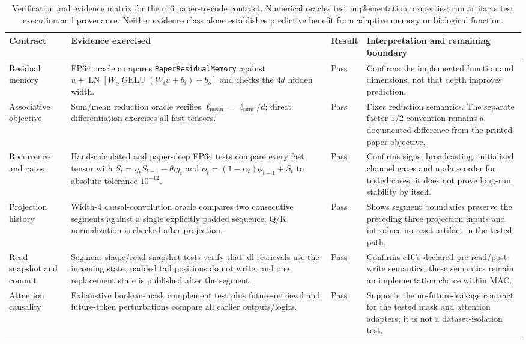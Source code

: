 \documentclass[10pt,twocolumn]{article}
\newcommand{\code}[1]{\texttt{#1}}
\begin{document}
\begin{table}[!t]
\centering
\caption{Verification and evidence matrix for the c16 paper-to-code contract. Numerical oracles test implementation properties; run artifacts test execution and provenance. Neither evidence class alone establishes predictive benefit from adaptive memory or biological function.}
\label{tab:verification}
\scriptsize
\setlength{\tabcolsep}{3pt}
\renewcommand{\arraystretch}{1.12}
\begin{tabularx}{\textwidth}{@{}>{\raggedright\arraybackslash}p{}>{\raggedright\arraybackslash}p{}>{\centering\arraybackslash}p{}>{\raggedright\arraybackslash}X@{}}
\toprule
Contract & Evidence exercised & Result & Interpretation and remaining boundary\\
\midrule
Residual memory & FP64 oracle compares \code{PaperResidualMemory} against $u+\operatorname{LN}[W_o\operatorname{GELU}(W_i u+b_i)+b_o]$ and checks the $4d$ hidden width. & Pass & Confirms the implemented function and dimensions, not that depth improves prediction.\\
Associative objective & Sum/mean reduction oracle verifies $\ell_{\mathrm{mean}}=\ell_{\mathrm{sum}}/d$; direct differentiation exercises all fast tensors. & Pass & Fixes reduction semantics. The separate factor-$1/2$ convention remains a documented difference from the printed paper objective.\\
Recurrence and gates & Hand-calculated and paper-deep FP64 tests compare every fast tensor with $S_t=\eta_tS_{t-1}-\theta_tg_t$ and $\phi_t=(1-\alpha_t)\phi_{t-1}+S_t$ to absolute tolerance $10^{-12}$. & Pass & Confirms signs, broadcasting, initialized channel gates and update order for tested cases; it does not prove long-run stability by itself.\\
Projection history & Width-4 causal-convolution oracle compares two consecutive segments against a single explicitly padded sequence; Q/K normalization is checked after projection. & Pass & Shows segment boundaries preserve the preceding three projection inputs and introduce no reset artifact in the tested path.\\
Read snapshot and commit & Segment-shape/read-snapshot tests verify that all retrievals use the incoming state, padded tail positions do not write, and one replacement state is published after the segment. & Pass & Confirms c16's declared pre-read/post-write semantics; these semantics remain an implementation choice within MAC.\\
Attention causality & Exhaustive boolean-mask complement test plus future-retrieval and future-token perturbations compare all earlier outputs/logits. & Pass & Supports the no-future-leakage contract for the tested mask and attention adapters; it is not a dataset-isolation test.\\

\end{tabularx}
\end{table}
\end{document}
